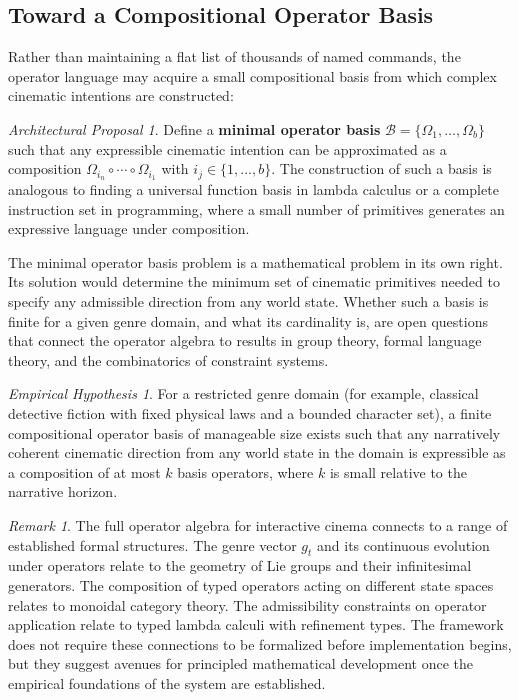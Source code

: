 \documentclass[12pt,a4paper]{article}
\theoremstyle{plain}
\theoremstyle{definition}
\theoremstyle{remark}
\newtheorem{remark}[theorem]{Remark}
\newtheorem{hypothesis}[theorem]{Empirical Hypothesis}
\newtheorem{proposal}[theorem]{Architectural Proposal}
\begin{document}
\subsection{Toward a Compositional Operator Basis}

Rather than maintaining a flat list of thousands of named commands, the operator language may acquire a small compositional basis from which complex cinematic intentions are constructed:

\begin{proposal}
\label{prop:basis}
Define a \textbf{minimal operator basis} $\mathcal{B} = \{\Omega_1, \ldots, \Omega_b\}$ such that any expressible cinematic intention can be approximated as a composition $\Omega_{i_n} \circ \cdots \circ \Omega_{i_1}$ with $i_j \in \{1, \ldots, b\}$. The construction of such a basis is analogous to finding a universal function basis in lambda calculus or a complete instruction set in programming, where a small number of primitives generates an expressive language under composition.
\end{proposal}

The minimal operator basis problem is a mathematical problem in its own right. Its solution would determine the minimum set of cinematic primitives needed to specify any admissible direction from any world state. Whether such a basis is finite for a given genre domain, and what its cardinality is, are open questions that connect the operator algebra to results in group theory, formal language theory, and the combinatorics of constraint systems.

\begin{hypothesis}
\label{hyp:basis}
For a restricted genre domain (for example, classical detective fiction with fixed physical laws and a bounded character set), a finite compositional operator basis of manageable size exists such that any narratively coherent cinematic direction from any world state in the domain is expressible as a composition of at most $k$ basis operators, where $k$ is small relative to the narrative horizon.
\end{hypothesis}

\begin{remark}
The full operator algebra for interactive cinema connects to a range of established formal structures. The genre vector $g_t$ and its continuous evolution under operators relate to the geometry of Lie groups and their infinitesimal generators. The composition of typed operators acting on different state spaces relates to monoidal category theory. The admissibility constraints on operator application relate to typed lambda calculi with refinement types. The framework does not require these connections to be formalized before implementation begins, but they suggest avenues for principled mathematical development once the empirical foundations of the system are established.
\end{remark}
\end{document}
